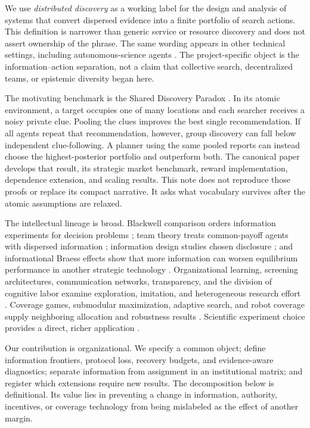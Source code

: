\documentclass[11pt]{article}
\theoremstyle{remark}
\begin{document}
We use \emph{distributed discovery} as a working label for the design and analysis of systems that convert dispersed evidence into a finite portfolio of search actions. This definition is narrower than generic service or resource discovery and does not assert ownership of the phrase. The same wording appears in other technical settings, including autonomous-science agents \citep{WangEtAl2026DistributedDiscovery}. The project-specific object is the information--action separation, not a claim that collective search, decentralized teams, or epistemic diversity began here.

The motivating benchmark is the Shared Discovery Paradox \citep{Nakajima2026SharedDiscovery}. In its atomic environment, a target occupies one of many locations and each searcher receives a noisy private clue. Pooling the clues improves the best single recommendation. If all agents repeat that recommendation, however, group discovery can fall below independent clue-following. A planner using the same pooled reports can instead choose the highest-posterior portfolio and outperform both. The canonical paper develops that result, its strategic market benchmark, reward implementation, dependence extension, and scaling results. This note does not reproduce those proofs or replace its compact narrative. It asks what vocabulary survives after the atomic assumptions are relaxed.

The intellectual lineage is broad. Blackwell comparison orders information experiments for decision problems \citep{Blackwell1953}; team theory treats common-payoff agents with dispersed information \citep{MarschakRadner1972}; information design studies chosen disclosure \citep{KamenicaGentzkow2011}; and informational Braess effects show that more information can worsen equilibrium performance in another strategic technology \citep{AcemogluEtAl2018}. Organizational learning, screening architectures, communication networks, transparency, and the division of cognitive labor examine exploration, imitation, and heterogeneous research effort \citep{March1991,SahStiglitz1986,LazerFriedman2007,Bernstein2012,Kitcher1990,Zollman2007}. Coverage games, submodular maximization, adaptive search, and robot coverage supply neighboring allocation and robustness results \citep{Vetta2002,Gairing2009,NemhauserEtAl1978,GolovinKrause2011,HazonKaminka2008}. Scientific experiment choice provides a direct, richer application \citep{RzhetskyEtAl2015}.

Our contribution is organizational. We specify a common object; define information frontiers, protocol loss, recovery budgets, and evidence-aware diagnostics; separate information from assignment in an institutional matrix; and register which extensions require new results. The decomposition below is definitional. Its value lies in preventing a change in information, authority, incentives, or coverage technology from being mislabeled as the effect of another margin.
\end{document}
